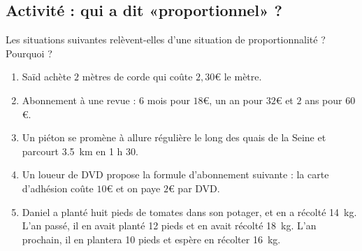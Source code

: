 
\subsection*{Activité : qui a dit «proportionnel» ?}

Les situations suivantes relèvent-elles d’une situation de proportionnalité ? Pourquoi ?
\begin{enumerate}
    \item

 Saïd achète $2$ mètres de corde qui coûte $2,30$€ le mètre.


\item

 Abonnement à une revue : \( 6\) mois pour \( 18\)€, un an pour \( 32\)€ et \( 2\) ans pour \( 60\)€.
\item
    Un piéton se promène à allure régulière le long des quais de la Seine et parcourt \SI{3.5}{\kilo\meter} en 1 h 30.
\item

 Un loueur de DVD propose la formule d'abonnement suivante : la carte d'adhésion coûte $10$€ et on paye $2$€ par DVD.

\item
    Daniel a planté huit pieds de tomates dans son potager, et en a récolté \SI{14}{\kilo\gram}. L'an passé, il en avait planté 12 pieds et en avait récolté \SI{18}{\kilo\gram}. L'an prochain, il en plantera 10 pieds et espère en récolter \SI{16}{\kilo\gram}. 
\end{enumerate}
